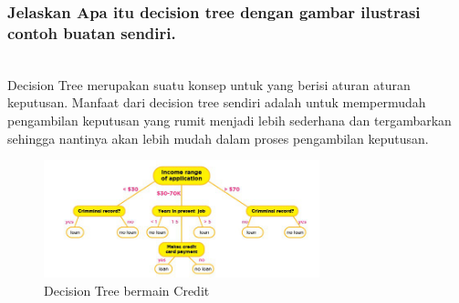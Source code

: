 \subsubsection{Jelaskan Apa itu decision tree dengan gambar ilustrasi contoh buatan sendiri.}
\hfill\\
Decision Tree merupakan suatu konsep untuk yang berisi aturan aturan keputusan. Manfaat dari decision tree sendiri adalah untuk mempermudah pengambilan keputusan yang rumit menjadi lebih sederhana dan tergambarkan sehingga nantinya akan lebih mudah dalam proses pengambilan keputusan.
\begin{figure}[H]
    \includegraphics[width=8cm]{figures/1174079/2/decisiontree.png}
    \centering
    \caption{Decision Tree bermain Credit}
\end{figure}



